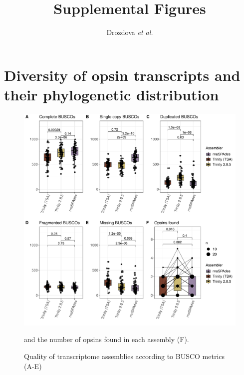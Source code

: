 \documentclass{article}
\begin{document}
	
\title{Supplemental Figures} %
\author{Drozdova \textit{et al.}} %
\maketitle

\section{Diversity of opsin transcripts and their phylogenetic distribution}

\begin{figure}[H] 
\hskip -1cm \includegraphics[scale=0.8]{./FigS1_assembly_comparison.pdf}
	\caption{Quality of transcriptome assemblies according to BUSCO metrics (A-E)} and the number of opsins found in each assembly (F). \end{figure}
\end{document}
